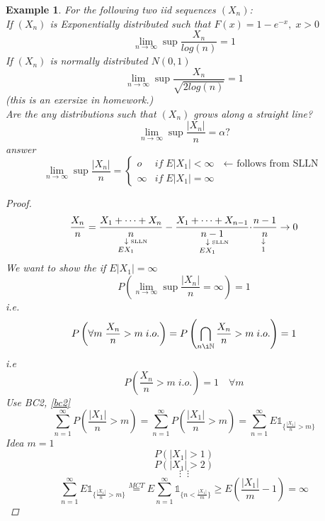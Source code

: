 \documentclass[12pt]{article}
\def\NN{\mathbb{N}}
\newtheorem{example}{Example}[section]
\begin{document}
\begin{example}
For the following two iid sequences $(X_n)$:\\
If $(X_n)$ is Exponentially distributed such that $F(x) = 1 - e^{-x}, \; x>0$
\[\lim_{n\rightarrow \infty}\sup \frac{X_n}{log(n)} =1\]
If $(X_n)$ is normally distributed $N(0,1)$
\[\lim_{n\rightarrow \infty}\sup \frac{X_n}{\sqrt{2log(n)}} =1\]
(this is an exersize in homework.)\\
Are the any distributions such that $(X_n)$ grows along a straight line?
\[\lim_{n\rightarrow \infty}\sup\frac{|X_n|}{n} = \alpha ?\]
answer
\[\lim_{n\rightarrow \infty}\sup\frac{|X_n|}{n} = \begin{cases} o & if \; E|X_1| < \infty \text{ $\leftarrow$ follows from SLLN}\\
\infty & if \; E|X_1|=\infty \end{cases}\]
\begin{proof}
\[\frac{X_n}{n} = \underset{EX_1 \quad}{\underset{\quad \downarrow \; \text{\tiny SLLN}}{\frac{X_1 + \dots +X_n}{n}}} - \underset{EX_1 \quad}{\underset{\quad \downarrow \;  \text{\tiny SLLN}}{\frac{X_1 + \dots +X_{n-1}}{n-1}}}\underset{1}{\underset{ \downarrow }{\cdot\frac{n-1}{n}}} \rightarrow 0 \]
We want to show the if $E|X_1|= \infty$
\[P\left(\lim_{n\rightarrow \infty}\sup\frac{|X_n|}{n} = \infty \right)=1\]
i.e.
\[P\left( \forall m \; \frac{X_n}{n} >m  \; i.o.\right) = P\left( \bigcap_{n \i \NN}\frac{X_n}{n} >m  \; i.o.\right) =1\]
i.e 
\[P\left(\frac{X_n}{n} >m  \; i.o.\right) =1 \quad \forall m\]
Use BC2, \ref{bc2}
\[\sum\limits_{n=1}^{\infty}P\left (\frac{|X_1|}{n} > m \right) =  \sum\limits_{n=1}^{\infty}P\left(\frac{|X_1|}{n} > m \right) = \sum\limits_{n=1}^{\infty}E{\mathbb 1}_{\{\frac{|X_1|}{n} > m\}}\]
Idea $m =1 $ 
\[P(|X_1|>1)\]\[P(|X_1|>2)\]\[\vdots \; \; \vdots\]
\[\sum\limits_{n=1}^{\infty}E{\mathbb 1}_{\{\frac{|X_1|}{n} > m\}} \overset{MCT}{=} E\sum\limits_{n=1}^{\infty}{\mathbb 1}_{\{ n <\frac{|X_1|}{m} \}} \geq E\left(\frac{|X_1|}{m} - 1\right)= \infty\]
\end{proof}
\end{example}
\end{document}
